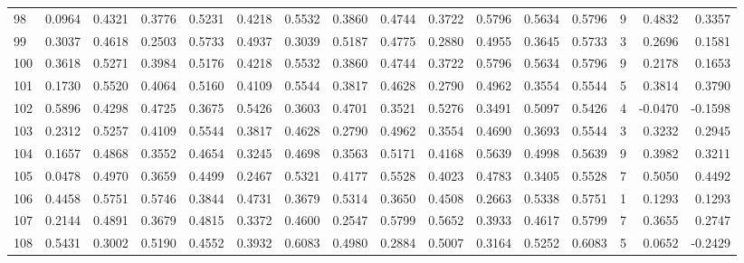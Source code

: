 \begin{tabular}{lrrrrrrrrrrrrrrr}
98  &      0.0964 &  0.4321 &  0.3776 &  0.5231 &  0.4218 &  0.5532 &  0.3860 &  0.4744 &  0.3722 &  0.5796 &   0.5634 &     0.5796 &      9 &                    0.4832 &                     0.3357 \\
99  &      0.3037 &  0.4618 &  0.2503 &  0.5733 &  0.4937 &  0.3039 &  0.5187 &  0.4775 &  0.2880 &  0.4955 &   0.3645 &     0.5733 &      3 &                    0.2696 &                     0.1581 \\
100 &      0.3618 &  0.5271 &  0.3984 &  0.5176 &  0.4218 &  0.5532 &  0.3860 &  0.4744 &  0.3722 &  0.5796 &   0.5634 &     0.5796 &      9 &                    0.2178 &                     0.1653 \\
101 &      0.1730 &  0.5520 &  0.4064 &  0.5160 &  0.4109 &  0.5544 &  0.3817 &  0.4628 &  0.2790 &  0.4962 &   0.3554 &     0.5544 &      5 &                    0.3814 &                     0.3790 \\
102 &      0.5896 &  0.4298 &  0.4725 &  0.3675 &  0.5426 &  0.3603 &  0.4701 &  0.3521 &  0.5276 &  0.3491 &   0.5097 &     0.5426 &      4 &                   -0.0470 &                    -0.1598 \\
103 &      0.2312 &  0.5257 &  0.4109 &  0.5544 &  0.3817 &  0.4628 &  0.2790 &  0.4962 &  0.3554 &  0.4690 &   0.3693 &     0.5544 &      3 &                    0.3232 &                     0.2945 \\
104 &      0.1657 &  0.4868 &  0.3552 &  0.4654 &  0.3245 &  0.4698 &  0.3563 &  0.5171 &  0.4168 &  0.5639 &   0.4998 &     0.5639 &      9 &                    0.3982 &                     0.3211 \\
105 &      0.0478 &  0.4970 &  0.3659 &  0.4499 &  0.2467 &  0.5321 &  0.4177 &  0.5528 &  0.4023 &  0.4783 &   0.3405 &     0.5528 &      7 &                    0.5050 &                     0.4492 \\
106 &      0.4458 &  0.5751 &  0.5746 &  0.3844 &  0.4731 &  0.3679 &  0.5314 &  0.3650 &  0.4508 &  0.2663 &   0.5338 &     0.5751 &      1 &                    0.1293 &                     0.1293 \\
107 &      0.2144 &  0.4891 &  0.3679 &  0.4815 &  0.3372 &  0.4600 &  0.2547 &  0.5799 &  0.5652 &  0.3933 &   0.4617 &     0.5799 &      7 &                    0.3655 &                     0.2747 \\
108 &      0.5431 &  0.3002 &  0.5190 &  0.4552 &  0.3932 &  0.6083 &  0.4980 &  0.2884 &  0.5007 &  0.3164 &   0.5252 &     0.6083 &      5 &                    0.0652 &                    -0.2429 \\

\end{tabular}
